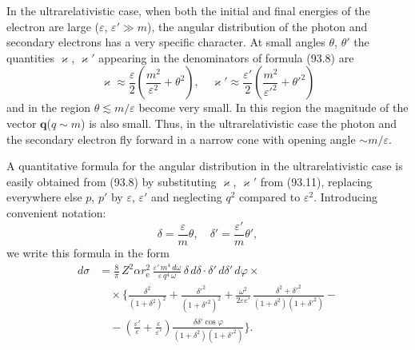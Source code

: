 In the ultrarelativistic case, when both the initial and final energies of the electron are large ($\varepsilon$, $\varepsilon' \gg m$), the angular distribution of the photon and secondary electrons has a very specific character. At small angles $\theta$, $\theta'$ the quantities $\varkappa$, $\varkappa'$ appearing in the denominators of formula (93.8) are
\begin{equation}
\varkappa \approx \frac{\varepsilon}{2}\left(\frac{m^2}{\varepsilon^2} + \theta^2\right), \quad \varkappa' \approx \frac{\varepsilon'}{2}\left(\frac{m^2}{\varepsilon'^2} + \theta'^2\right)
\label{eq:93.11}
\end{equation}
and in the region $\theta \lesssim m/\varepsilon$ become very small. In this region the magnitude of the vector $\mathbf{q}$($q \sim m$) is also small. Thus, in the ultrarelativistic case the photon and the secondary electron fly forward in a narrow cone with opening angle $\sim m/\varepsilon$.

A quantitative formula for the angular distribution in the ultrarelativistic case is easily obtained from (93.8) by substituting $\varkappa$, $\varkappa'$ from (93.11), replacing everywhere else $p$, $p'$ by $\varepsilon$, $\varepsilon'$ and neglecting $q^2$ compared to $\varepsilon^2$. Introducing convenient notation:
\begin{equation}
\delta = \frac{\varepsilon}{m}\theta, \quad \delta' = \frac{\varepsilon'}{m}\theta',
\label{eq:93.12}
\end{equation}
we write this formula in the form
\begin{equation}
\begin{split}
d\sigma &= \frac{8}{\pi}\,Z^2\alpha r_\mathrm{e}^2\,\frac{\varepsilon'\,m^4\,d\omega}{\varepsilon\,q^4\,\omega}\,\delta\,d\delta\cdot\delta'\,d\delta'\,d\varphi \times {} \\
&\quad \times \biggl\{\frac{\delta^2}{(1+\delta^2)^2} + \frac{\delta'^2}{(1+\delta'^2)^2} + \frac{\omega^2}{2\varepsilon\varepsilon'}\,\frac{\delta^2+\delta'^2}{(1+\delta^2)(1+\delta'^2)} - {} \\
&\quad {} - \left(\frac{\varepsilon'}{\varepsilon} + \frac{\varepsilon}{\varepsilon'}\right)\frac{\delta\delta'\cos\varphi}{(1+\delta^2)(1+\delta'^2)}\biggr\}.
\end{split}
\label{eq:93.13}
\end{equation}


